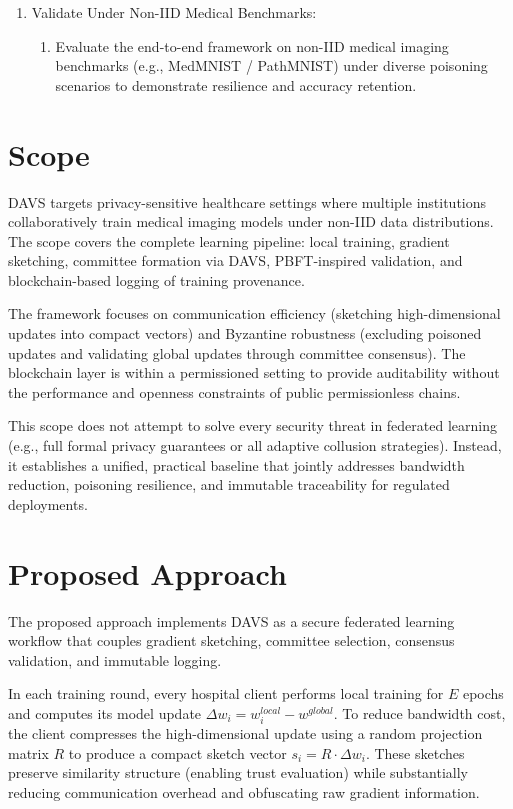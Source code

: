 \begin{enumerate}
  \item Validate Under Non-IID Medical Benchmarks:
  \begin{enumerate}
    \item Evaluate the end-to-end framework on non-IID medical imaging benchmarks (e.g., MedMNIST / PathMNIST) under diverse poisoning scenarios to demonstrate resilience and accuracy retention.
  \end{enumerate}
\end{enumerate}


\section{Scope}
DAVS targets privacy-sensitive healthcare settings where multiple institutions collaboratively train medical imaging models under non-IID data distributions. The scope covers the complete learning pipeline: local training, gradient sketching, committee formation via DAVS, PBFT-inspired validation, and blockchain-based logging of training provenance.

The framework focuses on communication efficiency (sketching high-dimensional updates into compact vectors) and Byzantine robustness (excluding poisoned updates and validating global updates through committee consensus). The blockchain layer is within a permissioned setting to provide auditability without the performance and openness constraints of public permissionless chains.

This scope does not attempt to solve every security threat in federated learning (e.g., full formal privacy guarantees or all adaptive collusion strategies). Instead, it establishes a unified, practical baseline that jointly addresses bandwidth reduction, poisoning resilience, and immutable traceability for regulated deployments.



\section{Proposed Approach}
The proposed approach implements DAVS as a secure federated learning workflow that couples gradient sketching, committee selection, consensus validation, and immutable logging.

In each training round, every hospital client performs local training for \(E\) epochs and computes its model update \(\Delta w_i = w_i^{local} - w^{global}\). To reduce bandwidth cost, the client compresses the high-dimensional update using a random projection matrix \(R\) to produce a compact sketch vector \(s_i = R \cdot \Delta w_i\). These sketches preserve similarity structure (enabling trust evaluation) while substantially reducing communication overhead and obfuscating raw gradient information.

